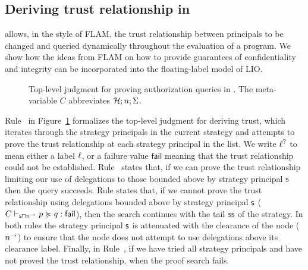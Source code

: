 \subsection{Deriving trust relationship in \lang}\label{subsec:deriving-trust}
\lang{} allows, in the style of FLAM, the trust relationship between principals to be changed and queried dynamically throughout the evaluation of a program. We show how the ideas from FLAM on how to provide guarantees of confidentiality and integrity can be incorporated into the floating-label model of LIO.

\begin{figure}
    \centering
    \caption{Top-level judgment for proving authorization queries in \lang. The meta-variable $C$ abbreviates $\mathcal{H}; n; \Sigma$.}
    \label{fig:top-level-act-for-judgment}
\end{figure}

Rule~ in Figure~\ref{fig:top-level-act-for-judgment} formalizes the top-level judgment for deriving trust, which iterates through the strategy principals in the current strategy and attempts to prove the trust relationship at each strategy principal in the list. We write $\ell^?$ to mean either a label $\ell$, or a failure value $\mathsf{fail}$ meaning that the trust relationship could not be established. Rule~ states that, if we can prove the trust relationship limiting our use of delegations to those bounded above by strategy principal $\stratelem$ then the query succeeds. Rule  states that, if we cannot prove the trust relationship using delegations bounded above by strategy principal $\stratelem$ ($\notactsforquery{C}[\stratelem \meet \conf{n}]{p}{q}$), then the search continues with the tail $\stratelem*$ of the strategy. In both rules the strategy principal $\stratelem$ is attenuated with the clearance of the node ($n^{\rightarrow}$) to ensure that the node does not attempt to use delegations above its clearance label. Finally, in Rule~, if we have tried all strategy principals and have not proved the trust relationship, when the proof search fails. 

